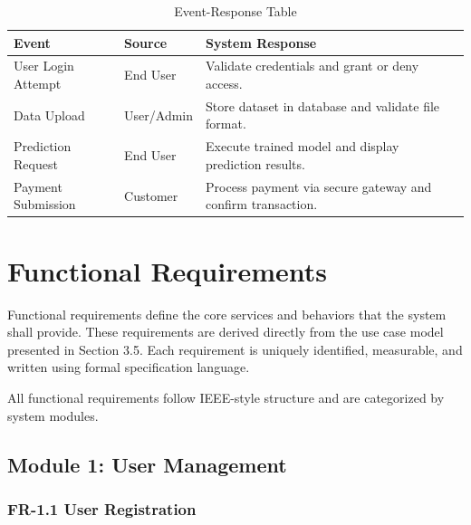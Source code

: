 \begin{table}[h]
\centering
\caption{Event-Response Table}

\begin{tabularx}{\textwidth}{
|>{\raggedright\arraybackslash}p{3.5cm}
|>{\raggedright\arraybackslash}p{3cm}
|>{\raggedright\arraybackslash}X|}

\hline
\textbf{Event} & \textbf{Source} & \textbf{System Response} \\ \hline

User Login Attempt & End User & Validate credentials and grant or deny access. \\ \hline

Data Upload & User/Admin & Store dataset in database and validate file format. \\ \hline

Prediction Request & End User & Execute trained model and display prediction results. \\ \hline

Payment Submission & Customer & Process payment via secure gateway and confirm transaction. \\ \hline

\end{tabularx}

\end{table}

\section{Functional Requirements}

Functional requirements define the core services and behaviors that the system shall provide. 
These requirements are derived directly from the use case model presented in Section 3.5. 
Each requirement is uniquely identified, measurable, and written using formal specification language.

All functional requirements follow IEEE-style structure and are categorized by system modules.


\subsection{Module 1: User Management}

\subsubsection{FR-1.1 User Registration}

